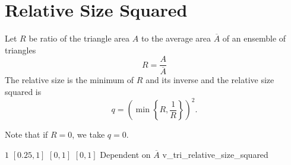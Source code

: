\section{Relative Size Squared\label{s:tri-rel-size-squared}}

Let $R$ be ratio of the triangle area $A$ to the average area $\overline{A}$ of an ensemble of triangles
\[
  R = \frac{A}{\overline{A}}
\]
The relative size is the minimum of $R$ and its inverse and the relative size squared is
\[
  q = \left( \min\left\{R,\frac{1}{R}\right\} \right)^2.
\]

Note that if $R = 0$, we take $q = 0$.

%
{$1$}%
{$[0.25,1]$}%
{$[0,1]$}%
{$[0,1]$}%
{Dependent on $\overline{A}$}%
{\cite{knu:03}}%
{v\_tri\_relative\_size\_squared}%

